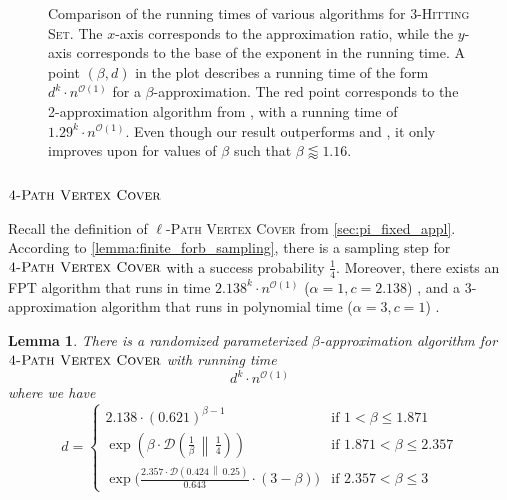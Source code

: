 \documentclass[letterpaper,11pt]{article}
\newcommand{\1}[1]{\mathds{1}\left[#1\right]}
\newcommand{\D}[2]{\mathcal{D}\left(#1\, \middle\|\,#2 \right)}
\newcommand{\Oh}{\mathcal{O}}
\newtheorem{lemma}[theorem]{Lemma}
\newcommand{\pathvc}[1]{\ensuremath{#1}\textsc{-Path Vertex Cover}\xspace}
\newcommand{\hs}[1]{\ensuremath{#1}\textsc{-Hitting Set}\xspace}
\begin{document}
\begin{figure}[h!]
 	\caption{Comparison of the running times of various algorithms for \hs{3}.
	The $x$-axis corresponds to the approximation ratio, while the $y$-axis corresponds to the base of the exponent in the running time.
	A point $(\beta, d)$ in the plot describes a running time of the form $d^{k} \cdot n^{\Oh(1)}$
	for a $\beta$-approximation. The red point corresponds to the 2-approximation algorithm from \cite{brankovicParameterizedApproximationAlgorithms2012}, with a
	running time of $1.29^{k} \cdot n^{\Oh(1)}$. Even though our result outperforms \cite{brankovicParameterizedApproximationAlgorithms2012} and \cite{Fellows2018}, it only improves upon \cite{KulikS2020} for values of $\beta$ such that $\beta \lessapprox 1.16$.}	
	\label{fig:3hsplot}
\end{figure}



 
\subsection{$\pathvc{4}$}
Recall the definition of \pathvc{\ell} from \cref{sec:pi_fixed_appl}. 
According to \cref{lemma:finite_forb_sampling}, there is
a sampling step for\\$\pathvc{4}$ with a success probability $\frac{1}{4}$.
Moreover, there exists an FPT algorithm that runs in time
$2.138^{k} \cdot n^{\Oh(1)}$ ($\alpha = 1, c = 2.138$) \cite{cervenyGeneratingFasterAlgorithms2023},
and a 3-approximation algorithm
that runs in polynomial time ($\alpha = 3, c = 1$) \cite{Camby2014}.

\begin{lemma}\label{lemma:4pvc_running_time}
	There is a randomized parameterized $\beta$-approximation algorithm
	for $\pathvc{4}$ with running time
	\begin{equation*}
		d^{k} \cdot n^{\Oh(1)}
	\end{equation*}
	where we have
	\begin{equation*}d = \begin{cases}
			2.138 \cdot \left(0.621\right) ^{\beta - 1} &\text{if } 1 < \beta \leq 1.871\\
			\exp\left( \beta \cdot \D{\frac{1}{\beta}}{\frac{1}{4}} \right) &\text{if } 1.871 < \beta \leq 2.357\\
			\exp\biggl( \frac{ 2.357 \cdot \D{ 0.424 }{ 0.25 }  }{ 0.643 } \cdot (3 - \beta)  \biggr) &\text{if } 2.357 < \beta \leq 3 
		\end{cases}
	\end{equation*}	
\end{lemma}
\end{document}
